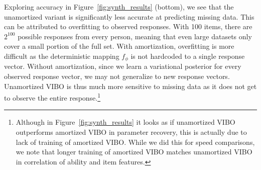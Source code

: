 Exploring accuracy in Figure~\ref{fig:synth_results} (bottom), we see that the unamortized variant is significantly less accurate at predicting missing data. This can be attributed to overfitting to observed responses.
With 100 items, there are $2^{100}$ possible responses from every person, meaning that even large datasets only cover a small portion of the full set.
With amortization, overfitting is more difficult as the deterministic mapping $f_\phi$ is not hardcoded to a single response vector.
Without amortization, since we learn a variational posterior for every observed response vector, we may not generalize to new response vectors.
Unamortized VIBO is thus much more sensitive to missing data as it does not get to observe the entire response.\footnote{Although in Figure~\ref{fig:synth_results} it looks as if unamortized VIBO outperforms amortized VIBO in parameter recovery, this is actually due to lack of training of amortized VIBO. While we did this for speed comparisons, we note that longer training of amortized VIBO matches unamortized VIBO in correlation of ability and item features.}

